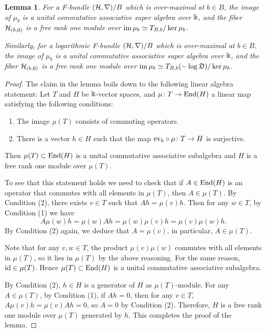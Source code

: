 \documentclass[twoside,leqno]{article}
\numberwithin{equation}{section}
\theoremstyle{plain}
\newtheorem{lemma}[equation]{Lemma}
\theoremstyle{definition}
\begin{document}
\begin{lemma} \label{lem:algebra}
For a  F-bundle $(\mathcal H,\nabla)/B$ which is over-maximal at $b\in B$, the image of $\mu_b$ is a unital commutative associative super algebra over $\Bbbk$, and the fiber $\mathcal H_{(b,0)}$ is a free rank one module over 
$\operatorname{im} \mu_b \simeq T_{B,b}/\ker \mu_b$.

Similarly, for a logarithmic F-bundle $(\mathcal H,\nabla)/B$ which is over-maximal at $b\in B$, the image of $\mu_b$ is a unital commutative associative super algebra over $\Bbbk$, and the fiber $\mathcal H_{(b,0)}$ is a free rank one module over 
$\operatorname{im} \mu_b \simeq T_{B,b}(-\log \mathfrak{D})/\ker \mu_b$.
\end{lemma}
\begin{proof}
The claim in the lemma boils down to  the following linear algebra statement:  Let $T$ and $H$ be $\Bbbk$-vector spaces, and $\mu \colon T \to \operatorname{End}(H)$ a linear map satisfying the following conditions:
  \begin{enumerate}
    \item[(1)] The image $\mu(T)$ consists of commuting operators.
    \item[(2)] There is a vector $h \in H$ such that the map $\mathrm{ev}_h \circ \mu \colon T \to H$ is surjective.
  \end{enumerate}
  Then $\mu(T) \subset \operatorname{End}(H)$ is a unital commutative associative subalgebra and $H$ is a free rank one module over $\mu(T)$.

To see that this statement holds we need to check that if  $A \in \operatorname{End}(H)$ is an operator that commutes with all elements in $\mu(T)$, then  $A \in \mu(T)$. By Condition (2), there exists $v \in T$ such that $A h = \mu(v) h$.   Then for any $w \in T$, by Condition (1) we have
  \[ A \mu(w) h = \mu(w) A h = \mu(w) \mu(v) h = \mu(v) \mu(w) h. \]
  By Condition (2) again, we deduce that $A = \mu(v)$, in particular, $A \in \mu(T)$.
  
  Note that for any $v, w \in T$, the product $\mu(v)\mu(w)$ commutes with all elements in $\mu(T)$, so it lies in $\mu(T)$ by the above reasoning. For the same reason, $\mathrm{id} \in \mu(T)$.
  Hence $\mu(T) \subset \operatorname{End}(H)$ is a unital commutative associative subalgebra.

  By Condition (2), $h \in H$ is a generator of $H$ as $\mu(T)$-module.
  For any $A \in \mu(T)$, by Condition (1), if $A h = 0$, then for any $v \in T$, $A \mu(v) h = \mu(v) A h = 0$,
  so $A = 0$ by Condition (2).
  Therefore, $H$ is a free rank one module over $\mu(T)$ generated by $h$.
  This completes the proof of the lemma.
\end{proof}
\end{document}
